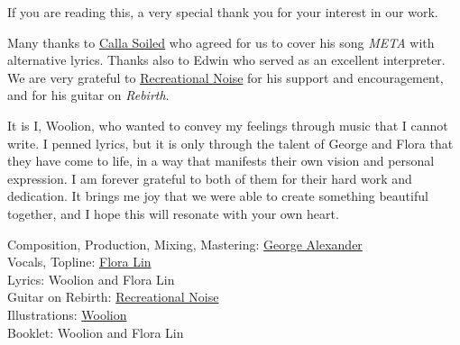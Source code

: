 
\vspace*{\fill}


If you are reading this, a very special thank you for your interest in our work.

Many thanks to \href{https://callasoiled.net/}{Calla Soiled} who agreed for us to cover his song \textit{META} with alternative lyrics.
Thanks also to Edwin who served as an excellent interpreter.
We are very grateful to \href{https://recreationalnoise.bandcamp.com/}{Recreational Noise} for his support and encouragement, and for his guitar on \textit{Rebirth}.

It is I, Woolion, who wanted to convey my feelings through music that I cannot write.
I penned lyrics, but it is only through the talent of George and Flora that they have come to life,
in a way that manifests their own vision and personal expression.
I am forever grateful to both of them for their hard work and dedication.
It brings me joy that we were able to create something beautiful together, and I hope this will resonate with your own heart.


Composition, Production, Mixing, Mastering: \href{https://linktr.ee/randleman}{George Alexander}\\
Vocals, Topline: \href{https://floralinmusic.com/}{Flora Lin}\\
Lyrics: Woolion and Flora Lin\\
Guitar on Rebirth: \href{https://recreationalnoise.bandcamp.com/}{Recreational Noise}\\
Illustrations: \href{https://woolion.art/}{Woolion}\\
Booklet: Woolion and Flora Lin
